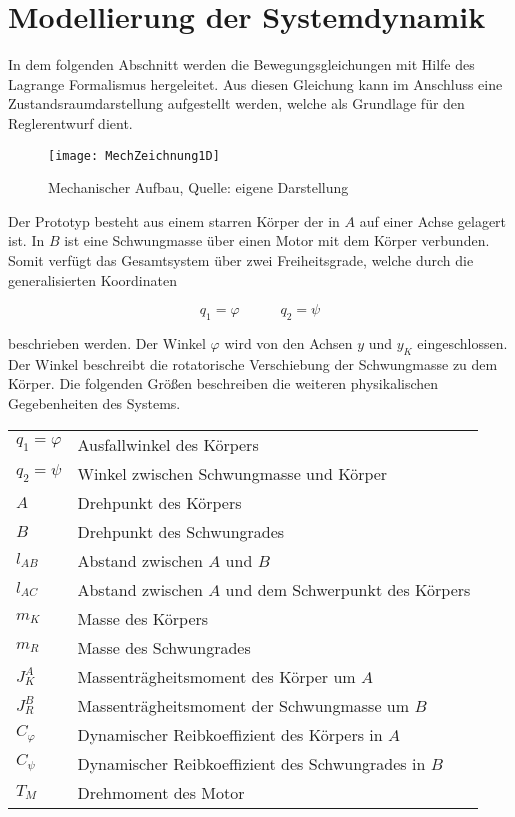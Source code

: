 \section{Modellierung der Systemdynamik}
In dem folgenden Abschnitt werden die Bewegungsgleichungen mit Hilfe des Lagrange Formalismus hergeleitet. Aus diesen Gleichung kann im Anschluss eine Zustandsraumdarstellung aufgestellt werden, welche als Grundlage für den Reglerentwurf dient.

\begin{figure}[h]
\centering
\texttt{[image: MechZeichnung1D]}
\caption{Mechanischer Aufbau, Quelle: eigene Darstellung}
\end{figure}

Der Prototyp besteht aus einem starren Körper der in $A$ auf einer Achse gelagert ist. In $B$ ist eine Schwungmasse über einen Motor mit dem Körper verbunden. Somit verfügt das Gesamtsystem über zwei Freiheitsgrade, welche durch die generalisierten Koordinaten 

\begin{equation}
q_1 = \varphi \hspace{35pt} q_2 = \psi
\end{equation}

beschrieben werden. Der Winkel $\varphi$ wird von den Achsen $y$ und $y_K$ eingeschlossen. Der Winkel beschreibt die rotatorische Verschiebung der Schwungmasse zu dem Körper. Die folgenden Größen beschreiben die weiteren physikalischen Gegebenheiten des Systems.\newline

\begin{table}[h]
\centering
\begin{tabular}{ll}
	$q_1 = \varphi$ & Ausfallwinkel des Körpers \\
	$q_2 = \psi$ & Winkel zwischen Schwungmasse und Körper \\
	$A$ & Drehpunkt des Körpers \\
	$B$ & Drehpunkt des Schwungrades \\
	$l_{AB}$ & Abstand zwischen $A$ und $B$ \\
	$l_{AC}$ & Abstand zwischen $A$ und dem Schwerpunkt des Körpers \\
	$m_K$ & Masse des Körpers \\
	$m_R$ & Masse des Schwungrades \\
	$J^A_K$ & Massenträgheitsmoment des Körper um $A$ \\
	$J^B_R$ & Massenträgheitsmoment der Schwungmasse um $B$ \\
	$C_{\varphi}$ & Dynamischer Reibkoeffizient des Körpers in $A$ \\
	$C_{\psi}$ & Dynamischer Reibkoeffizient des Schwungrades in $B$ \\
	$T_M$ & Drehmoment des Motor
\end{tabular}
\end{table}

